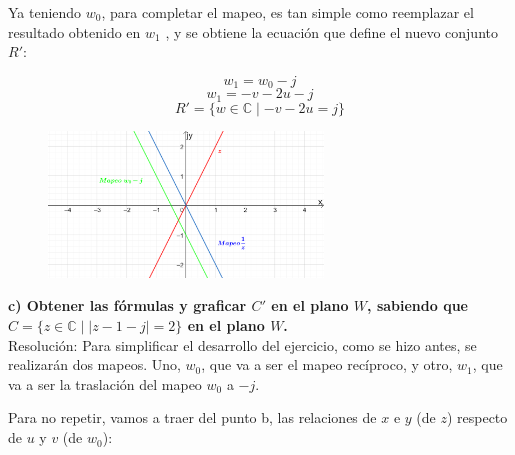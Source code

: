 \documentclass[12pt,a4paper]{report}
\begin{document}
Ya teniendo $w_0$, para completar el mapeo, es tan simple como reemplazar el resultado obtenido en $w_1$ , y se obtiene la ecuación que define el nuevo conjunto $R'$:

$$ w_1 = w_0 - j $$
$$ w_1 = -v - 2u - j $$
$$ R' = \{w \in \mathbb{C} \mid -v - 2u = j\} $$

\begin{figure}[h] %
    \centering %
    \includegraphics[width=0.65\textwidth]{./Imagenes/foto1Ej3.png} %
\end{figure}

\textbf{c) Obtener las fórmulas y graficar \( C' \) en el plano \( W \), sabiendo que \( C = \{z \in \mathbb{C} \mid |z - 1 - j| = 2\} \) en el plano \( W \).}\\[6pt]

Resolución: Para simplificar el desarrollo del ejercicio, como se hizo antes, se realizarán dos mapeos. Uno, \( w_0 \), que va a ser el mapeo recíproco, y otro, \( w_1 \), que va a ser la traslación del mapeo \( w_0 \) a \( -j \).

Para no repetir, vamos a traer del punto b, las relaciones de \( x \) e \( y \) (de \( z \)) respecto de \( u \) y \( v \) (de \( w_0 \)):
\end{document}
